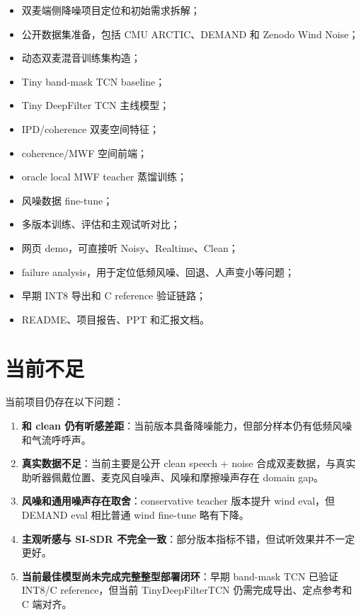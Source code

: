 \documentclass[UTF8,12pt,a4paper]{ctexart}
\begin{document}
\begin{itemize}
  \item 双麦端侧降噪项目定位和初始需求拆解；
  \item 公开数据集准备，包括 CMU ARCTIC、DEMAND 和 Zenodo Wind Noise；
  \item 动态双麦混音训练集构造；
  \item Tiny band-mask TCN baseline；
  \item Tiny DeepFilter TCN 主线模型；
  \item IPD/coherence 双麦空间特征；
  \item coherence/MWF 空间前端；
  \item oracle local MWF teacher 蒸馏训练；
  \item 风噪数据 fine-tune；
  \item 多版本训练、评估和主观试听对比；
  \item 网页 demo，可直接听 Noisy、Realtime、Clean；
  \item failure analysis，用于定位低频风噪、回退、人声变小等问题；
  \item 早期 INT8 导出和 C reference 验证链路；
  \item README、项目报告、PPT 和汇报文档。
\end{itemize}

\section{当前不足}

当前项目仍存在以下问题：

\begin{enumerate}
  \item \textbf{和 clean 仍有听感差距}：当前版本具备降噪能力，但部分样本仍有低频风噪和气流呼呼声。
  \item \textbf{真实数据不足}：当前主要是公开 clean speech + noise 合成双麦数据，与真实助听器佩戴位置、麦克风自噪声、风噪和摩擦噪声存在 domain gap。
  \item \textbf{风噪和通用噪声存在取舍}：conservative teacher 版本提升 wind eval，但 DEMAND eval 相比普通 wind fine-tune 略有下降。
  \item \textbf{主观听感与 SI-SDR 不完全一致}：部分版本指标不错，但试听效果并不一定更好。
  \item \textbf{当前最佳模型尚未完成完整整型部署闭环}：早期 band-mask TCN 已验证 INT8/C reference，但当前 TinyDeepFilterTCN 仍需完成导出、定点参考和 C 端对齐。
\end{enumerate}
\end{document}
